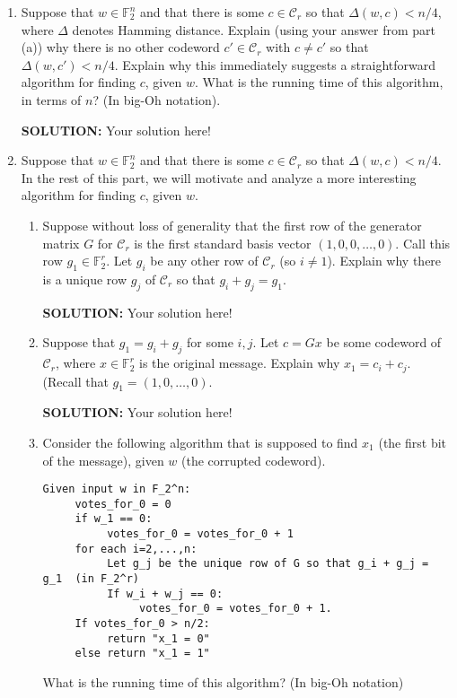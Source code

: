 \documentclass{article}
\newcommand{\cC}{\mathcal{C}}
\newcommand{\F}{\mathbb{F}}
\begin{document}
\begin{enumerate}
\begin{enumerate}
\item Suppose that $w \in \F_2^n$ and that there is some $c \in \cC_r$ so that $\Delta(w,c) < n/4$, where $\Delta$ denotes Hamming distance.  Explain (using your answer from part (a)) why there is no other codeword $c' \in \cC_r$ with $c \neq c'$ so that $\Delta(w,c') < n/4$.  Explain why this immediately suggests a straightforward algorithm for finding $c$, given $w$.  What is the running time of this algorithm, in terms of $n$?  (In big-Oh notation).

\begin{shaded}
\textbf{SOLUTION:}
Your solution here!
\end{shaded}

\item Suppose that $w \in \F_2^n$ and that there is some $c \in \cC_r$ so that $\Delta(w,c) < n/4$.  In the rest of this part, we will motivate and analyze a more interesting algorithm for finding $c$, given $w$.  
\begin{enumerate}
\item Suppose without loss of generality that the first row of the generator matrix $G$ for $\cC_r$ is the first standard basis vector $(1,0,0, \ldots, 0)$.  Call this row $g_1 \in \F_2^r$.
Let $g_i$ be any other row of $\cC_r$ (so $i \neq 1$). Explain why there is a unique row $g_j$ of $\cC_r$ so that  $g_i + g_j = g_1$.

\begin{shaded}
\textbf{SOLUTION:}
Your solution here!
\end{shaded}

\item Suppose that $g_1 = g_i + g_j$ for some $i,j$.
Let $c = Gx$ be some codeword of $\cC_r$, where $x \in \F_2^r$ is the original message.
Explain why $x_1 = c_i + c_j$.  (Recall that $g_1 = (1,0,\ldots, 0)$.

\begin{shaded}
\textbf{SOLUTION:}
Your solution here!
\end{shaded}

\item   Consider the following algorithm that is supposed to find $x_1$ (the first bit of the message), given $w$ (the corrupted codeword).
\begin{verbatim}
Given input w in F_2^n:
     votes_for_0 = 0
     if w_1 == 0:
          votes_for_0 = votes_for_0 + 1
     for each i=2,...,n:
          Let g_j be the unique row of G so that g_i + g_j = g_1  (in F_2^r)
          If w_i + w_j == 0: 
               votes_for_0 = votes_for_0 + 1. 
     If votes_for_0 > n/2:
          return "x_1 = 0"
     else return "x_1 = 1"
\end{verbatim}
What is the running time of this algorithm?  (In big-Oh notation)


\end{enumerate}
\end{enumerate}
\end{enumerate}
\end{document}
